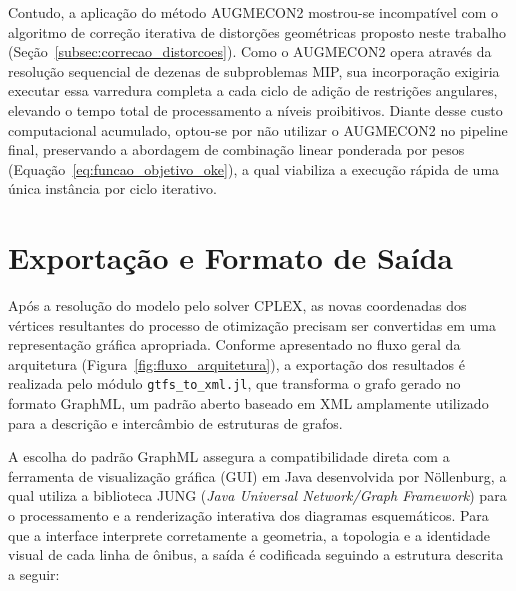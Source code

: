 \documentclass[cic,tc]{infufrgs}
\begin{document}
Contudo, a aplicação do método AUGMECON2 mostrou-se incompatível com o algoritmo de correção iterativa de distorções geométricas proposto neste trabalho (Seção~\ref{subsec:correcao_distorcoes}). Como o AUGMECON2 opera através da resolução sequencial de dezenas de subproblemas MIP, sua incorporação exigiria executar essa varredura completa a cada ciclo de adição de restrições angulares, elevando o tempo total de processamento a níveis proibitivos. Diante desse custo computacional acumulado, optou-se por não utilizar o AUGMECON2 no pipeline final, preservando a abordagem de combinação linear ponderada por pesos (Equação~\ref{eq:funcao_objetivo_oke}), a qual viabiliza a execução rápida de uma única instância por ciclo iterativo.

\section{Exportação e Formato de Saída}
\label{sec:exportacao}

Após a resolução do modelo pelo solver CPLEX, as novas coordenadas dos vértices resultantes do processo de otimização precisam ser convertidas em uma representação gráfica apropriada. Conforme apresentado no fluxo geral da arquitetura (Figura~\ref{fig:fluxo_arquitetura}), a exportação dos resultados é realizada pelo módulo \texttt{gtfs\_to\_xml.jl}, que transforma o grafo gerado no formato GraphML, um padrão aberto baseado em XML amplamente utilizado para a descrição e intercâmbio de estruturas de grafos.

A escolha do padrão GraphML assegura a compatibilidade direta com a ferramenta de visualização gráfica (GUI) em Java desenvolvida por Nöllenburg, a qual utiliza a biblioteca JUNG (\textit{Java Universal Network/Graph Framework}) para o processamento e a renderização interativa dos diagramas esquemáticos. Para que a interface interprete corretamente a geometria, a topologia e a identidade visual de cada linha de ônibus, a saída é codificada seguindo a estrutura descrita a seguir:
\end{document}

